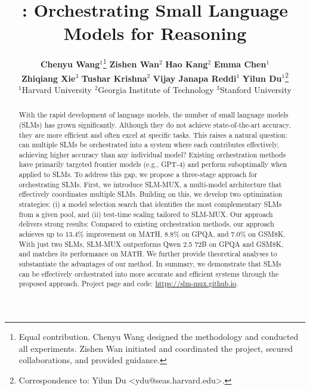 \documentclass{article}
\title{\NAME : Orchestrating Small Language Models for Reasoning}
\author{%
\textbf{Chenyu Wang}$^{1}$\thanks{Equal contribution. Chenyu Wang designed the methodology and conducted all experiments. Zishen Wan initiated and coordinated the project, secured collaborations, and provided guidance.} \quad
\textbf{Zishen Wan}$^{2}$\footnotemark[1] \quad
\textbf{Hao Kang}$^{2}$ \quad
\textbf{Emma Chen}$^{1}$ \\
\textbf{Zhiqiang Xie}$^{3}$ \quad
\textbf{Tushar Krishna}$^{2}$ \quad
\textbf{Vijay Janapa Reddi}$^{1}$ \quad
\textbf{Yilun Du}$^{1}$\thanks{Correspondence to: Yilun Du <ydu@seas.harvard.edu>.} \\
\small $^{1}$Harvard University \quad $^{2}$Georgia Institute of Technology \quad $^{3}$Stanford University
}
\newcommand{\NAME}{\textsc{SLM-MUX}}
\begin{document}
\maketitle

\thispagestyle{plain}
\pagestyle{plain}

\begin{abstract}
 With the rapid development of language models, the number of small language models (SLMs) has grown significantly. Although they do not achieve state-of-the-art accuracy, they are more efficient and often excel at specific tasks. This raises a natural question: can multiple SLMs be orchestrated into a system where each contributes effectively, achieving higher accuracy than any individual model? Existing orchestration methods have primarily targeted frontier models (e.g., GPT-4) and perform suboptimally when applied to SLMs. To address this gap, we propose a three-stage approach for orchestrating SLMs. First, we introduce \NAME{}, a multi-model architecture that effectively coordinates multiple SLMs. Building on this, we develop two optimization strategies: (i) a model selection search that identifies the most complementary SLMs from a given pool, and (ii) test-time scaling tailored to \NAME{}. Our approach delivers strong results: Compared to existing orchestration methods, our approach achieves up to 13.4\% improvement on MATH, 8.8\% on GPQA, and 7.0\% on GSM8K. With just two SLMs, \NAME{}  outperforms Qwen 2.5 72B on GPQA and GSM8K, and matches its performance on MATH. We further provide theoretical analyses to substantiate the advantages of our method. In summary, we demonstrate that SLMs can be effectively orchestrated into more accurate and efficient systems through the proposed approach. Project page and code: \url{https://slm-mux.github.io}.
\end{abstract}



\end{document}
